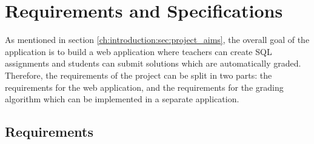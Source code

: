 \chapter{Requirements and Specifications} \label{ch:reqandspec}

As mentioned in section \ref{ch:introduction:sec:project_aims}, the overall goal of the application is to build a web application where teachers can create SQL assignments and students can submit solutions which are automatically graded. Therefore, the requirements of the project can be split in two parts: the requirements for the web application, and the requirements for the grading algorithm which can be implemented in a separate application.

\section{Requirements} \label{ch:reqandspec:sec:rec}

